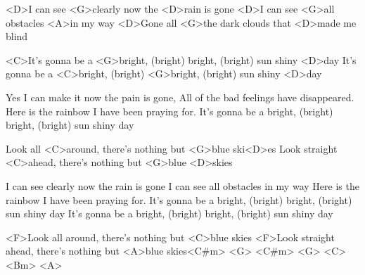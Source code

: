 

\zs
<D>I can see <G>clearly now the <D>rain is gone
<D>I can see <G>all obstacles <A>in my way
<D>Gone all <G>the dark clouds that <D>made me blind
\ks

\zr                 
<C>It's gonna be a <G>bright, (bright) bright, (bright) sun shiny <D>day
It's gonna be a <C>bright, (bright) <G>bright, (bright) sun shiny <D>day
\kr

\zs
Yes I can make it now the pain is gone,
All of the bad feelings have disappeared.
Here is the rainbow I have been praying for.
It's gonna be a bright, (bright) bright, (bright) sun shiny day
\ks

\zr 
Look all <C>around, there's nothing but <G>blue ski<D>es
Look straight <C>ahead, there's nothing but <G>blue <D>skies
\kr

\zs
I can see clearly now the rain is gone
I can see all obstacles in my way
Here is the rainbow I have been praying for.
It's gonna be a bright, (bright) bright, (bright) sun shiny day
It's gonna be a bright, (bright) bright, (bright) sun shiny day
\ks

\zr \kr

\zs
<F>Look all around, there's nothing but <C>blue skies
<F>Look straight ahead, there's nothing but <A>blue skies<C#m> <G> <C#m> <G> <C> <Bm> <A>
\ks

\kp

